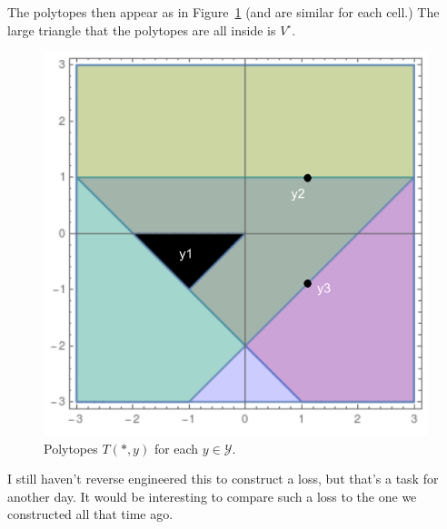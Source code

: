\documentclass[12pt]{article}
\newcommand{\Y}{\mathcal{Y}}
\begin{document}
The polytopes then appear as in Figure~\ref{fig:ranking-polytopes} (and are similar for each cell.)
The large triangle that the polytopes are all inside is $V^\circ$.
\begin{figure}
\centering
\includegraphics[width=0.7\linewidth]{./ranking}
\caption{Polytopes $T(*, y)$ for each $y \in \Y$.}
\label{fig:ranking-polytopes}
\end{figure}

I still haven't reverse engineered this to construct a loss, but that's a task for another day.
It would be interesting to compare such a loss to the one we constructed all that time ago.
\end{document}
